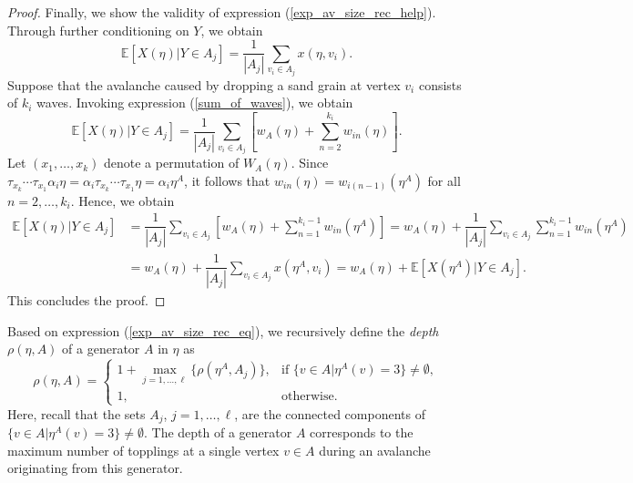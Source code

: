 \documentclass{article}
\begin{document}
\begin{proof}
    Finally, we show the validity of expression (\ref{exp_av_size_rec_help}). Through further conditioning on $Y$, we obtain
    \begin{equation*}
        \mathbb{E}[X(\eta)|Y \in A_j] =  \dfrac{1}{|A_j|}\sum\limits_{v_i \in A_j} x(\eta, v_i) . 
    \end{equation*}
    Suppose that the avalanche caused by dropping a sand grain at vertex $v_i$ consists of $k_i$ waves. Invoking expression (\ref{sum_of_waves}), we obtain
    \begin{equation*}
        \mathbb{E}[X(\eta)|Y \in A_j] = \dfrac{1}{|A_j|} \sum\limits_{v_i \in A_j} \left[w_A(\eta) + \sum\limits_{n=2}^{k_i} w_{in}(\eta) \right].
    \end{equation*}
    Let $(x_1, \ldots, x_k)$ denote a permutation of $W_A(\eta)$. Since $\tau_{x_k} \cdots \tau_{x_1} \alpha_i \eta = \alpha_i \tau_{x_k} \cdots \tau_{x_1} \eta = \alpha_i \eta^A$, it follows that $w_{in}(\eta) = w_{i(n-1)}(\eta^A)$ for all $n = 2, \ldots, k_i$. Hence, we obtain
    \begin{align*}
        \mathbb{E}[X(\eta)|Y \in A_j] &= \dfrac{1}{|A_j|} \sum\limits_{v_i \in A_j} \left[w_A(\eta) + \sum\limits_{n=1}^{k_i-1}w_{in}(\eta^A)\right] = w_A(\eta) + \dfrac{1}{|A_j|} \sum\limits_{v_i \in A_j} \sum\limits_{n=1}^{k_i-1} w_{in}(\eta^A) \\
        &= w_A(\eta) + \dfrac{1}{|A_j|} \sum\limits_{v_i \in A_j} x(\eta^A, v_i) = w_A(\eta) + \mathbb{E}[X(\eta^A)|Y \in A_j].
    \end{align*}
    This concludes the proof.
\end{proof}


Based on expression (\ref{exp_av_size_rec_eq}), we recursively define the \textit{depth} $\rho(\eta, A)$ of a generator $A$ in $\eta$ as
\begin{equation}\label{depth_def}
    \rho(\eta, A) = \begin{cases}
        1 + \max\limits_{j = 1, \ldots, \ell}\{\rho(\eta^A, A_j)\}, &\text{if } \{v \in A| \eta^A(v) = 3\} \neq \emptyset,\\
        1, &\text{otherwise.}
    \end{cases}
\end{equation}
Here, recall that the sets $A_j$, $j = 1, \ldots, \ell$, are the connected components of $\{v \in A| \eta^A(v) = 3\} \neq \emptyset$. The depth of a generator $A$ corresponds to the maximum number of topplings at a single vertex $v \in A$ during an avalanche originating from this generator. 
\end{document}
